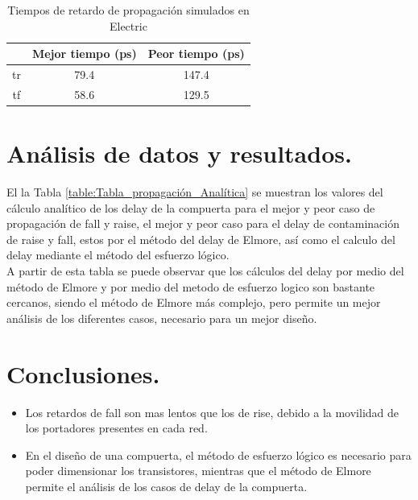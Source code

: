 \documentclass[12pt,a4paper]{article} %
\begin{document}
\begin{table}\label{table:Tabla_propagación}
\begin{center}
\begin{tabular}{c||c||c}
  & Mejor tiempo (ps) & Peor tiempo (ps)\\
\hline
\hline
tr & 79.4 & 147.4 \\
tf & 58.6 & 129.5 \\
\hline
\end{tabular}
\caption{Tiempos de retardo de propagación simulados en Electric}
\end{center}
\end{table}


\section{Análisis de datos y resultados.}

El la Tabla \ref{table:Tabla_propagación_Analítica} se muestran los valores del cálculo analítico de los delay de la compuerta para el mejor y peor caso de propagación de fall y raise, el mejor y peor caso para el delay de contaminación de raise y fall, estos por el método del delay de Elmore, así como el calculo del delay mediante el método del esfuerzo lógico.\\

A partir de esta tabla se puede observar que los cálculos del delay por medio del método de Elmore y por medio del metodo de esfuerzo logico son bastante cercanos, siendo el método de Elmore más complejo, pero permite un mejor análisis de los diferentes casos, necesario para un mejor diseño.\\


\section{Conclusiones.}
\begin{itemize}
\item Los retardos de fall son mas lentos que los de rise, debido a la movilidad de los portadores presentes en cada red.
\item En el diseño de una compuerta, el método de esfuerzo lógico es necesario para poder dimensionar los transistores, mientras que el método de Elmore permite el análisis de los casos de delay de la compuerta.
\end{itemize}
\end{document}
